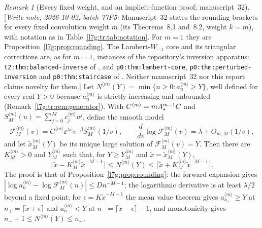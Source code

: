 \documentclass[11pt,letterpaper]{article}
\theoremstyle{remark}\newtheorem{remark}[theorem]{Remark}
\newcommand{\writenote}[1]{\textup{[}\emph{Write note, 2026-10-02, batch 77P5:} #1\textup{]}}
\newcounter{l7gtrsavedeq}
\begin{document}
\begin{remark}[Every fixed weight, and an implicit-function proof; manuscript~32]\label{l7g:tr:rem:ceiling}
\writenote{Manuscript~32 states the rounding brackets for every fixed
convolution weight $m$ (its Theorems~8.1 and~8.2, weight $k=m$), with
notation as in Table~\ref{l7g:tr:tab:notation}. For $m=1$ they are
Proposition~\ref{l7g:prop:rounding}. The Lambert-$W_{-1}$ core and its
triangular corrections are, as for $m=1$, instances of the repository's
inversion apparatus: \texttt{t2:thm:balanced-inverse} of \cite{l7g:cti}, and
\texttt{p0:thm:lambert-core}, \texttt{p0:thm:perturbed-inversion} and
\texttt{p0:thm:staircase} of \cite{l7g:tai}. Neither manuscript~32 nor this
report claims novelty for them.}
Let $N^{\langle m\rangle}(Y)=\min\{n\ge0:a_n^{\langle m\rangle}\ge Y\}$,
well defined for every real $Y>0$ because $a_n^{\langle m\rangle}$ is
strictly increasing and unbounded (Remark~\ref{l7g:tr:rem:generator}). With
$C^{\langle m\rangle}=mA_\star^{m-1}C$ and
$S_M^{\langle m\rangle}(u)=\sum_{j=0}^{M}c_j^{\langle m\rangle}u^j$, define
the smooth model
\[
 \mathcal F_M^{\langle m\rangle}(v)=C^{\langle m\rangle}\ee^{\lambda v}
 v^{-\beta}S_M^{\langle m\rangle}(1/v),\qquad
 \frac{d}{dv}\log\mathcal F_M^{\langle m\rangle}(v)=\lambda+O_{m,M}(1/v),
\]
and let $\tilde x_M^{\langle m\rangle}(Y)$ be its unique large solution of
$\mathcal F_M^{\langle m\rangle}(v)=Y$. Then there are $K_M^{\langle m\rangle}>0$
and $Y_M^{\langle m\rangle}$ such that, for $Y\ge Y_M^{\langle m\rangle}$ and
$\tilde x=\tilde x_M^{\langle m\rangle}(Y)$,
\[
 \bigl\lceil\tilde x-K_M^{\langle m\rangle}\tilde x^{-M-1}\bigr\rceil
 \le N^{\langle m\rangle}(Y)\le
 \bigl\lceil\tilde x+K_M^{\langle m\rangle}\tilde x^{-M-1}\bigr\rceil.
\]
The proof is that of Proposition~\ref{l7g:prop:rounding}: the forward
expansion gives $|\log a_n^{\langle m\rangle}-\log\mathcal
F_M^{\langle m\rangle}(n)|\le Dn^{-M-1}$; the logarithmic derivative is at
least $\lambda/2$ beyond a fixed point; for $\epsilon=K\tilde x^{-M-1}$ the
mean value theorem gives $a^{\langle m\rangle}_{n_+}\ge Y$ at
$n_+=\lceil\tilde x+\epsilon\rceil$ and $a^{\langle m\rangle}_{n_-}<Y$ at
$n_-=\lceil\tilde x-\epsilon\rceil-1$, and monotonicity gives
$n_-+1\le N^{\langle m\rangle}(Y)\le n_+$.


\end{remark}
\end{document}
